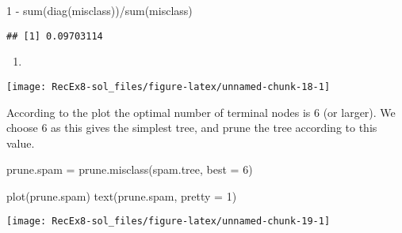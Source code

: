 \documentclass[
]{article}
\newenvironment{Shaded}{\begin{snugshade}}{\end{snugshade}}
\newcommand{\AttributeTok}[1]{\textcolor[rgb]{0.77,0.63,0.00}{#1}}
\newcommand{\DecValTok}[1]{\textcolor[rgb]{0.00,0.00,0.81}{#1}}
\newcommand{\FunctionTok}[1]{\textcolor[rgb]{0.00,0.00,0.00}{#1}}
\newcommand{\NormalTok}[1]{#1}
\newcommand{\OtherTok}[1]{\textcolor[rgb]{0.56,0.35,0.01}{#1}}
\newcommand{\SpecialCharTok}[1]{\textcolor[rgb]{0.00,0.00,0.00}{#1}}
\newcommand{\StringTok}[1]{\textcolor[rgb]{0.31,0.60,0.02}{#1}}
\providecommand{\tightlist}{%
  \setlength{\itemsep}{0pt}\setlength{\parskip}{0pt}}
\begin{document}
\begin{Shaded}
\begin{Highlighting}[]
\DecValTok{1} \SpecialCharTok{{-}} \FunctionTok{sum}\NormalTok{(}\FunctionTok{diag}\NormalTok{(misclass))}\SpecialCharTok{/}\FunctionTok{sum}\NormalTok{(misclass)}
\end{Highlighting}
\end{Shaded}

\begin{verbatim}
## [1] 0.09703114
\end{verbatim}

\begin{enumerate}
\def\labelenumi{\alph{enumi})}
\setcounter{enumi}{4}
\tightlist
\item
\end{enumerate}

\begin{Shaded}
\end{Shaded}

\texttt{[image: RecEx8-sol\_files/figure-latex/unnamed-chunk-18-1]}

According to the plot the optimal number of terminal nodes is 6 (or
larger). We choose 6 as this gives the simplest tree, and prune the tree
according to this value.

\begin{Shaded}
\begin{Highlighting}[]
\NormalTok{prune.spam }\OtherTok{=} \FunctionTok{prune.misclass}\NormalTok{(spam.tree, }\AttributeTok{best =} \DecValTok{6}\NormalTok{)}

\FunctionTok{plot}\NormalTok{(prune.spam)}
\FunctionTok{text}\NormalTok{(prune.spam, }\AttributeTok{pretty =} \DecValTok{1}\NormalTok{)}
\end{Highlighting}
\end{Shaded}

\texttt{[image: RecEx8-sol\_files/figure-latex/unnamed-chunk-19-1]}
\end{document}
